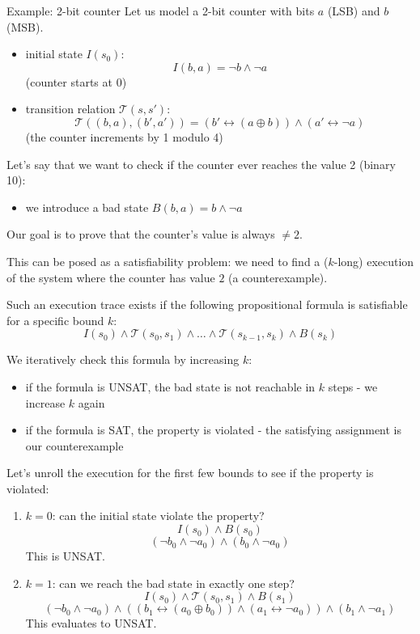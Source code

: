 \documentclass[a4paper, 11pt]{report}
\begin{document}
\begin{gframe}{Example: 2-bit counter}
Let us model a 2-bit counter with bits $a$ (LSB) and $b$ (MSB).

\begin{itemize}
    \item initial state $I(s_0)$:
        $$ I(b,a) = \neg b \wedge \neg a $$
        (counter starts at 0)
    
    \item transition relation $\mathcal{T}(s, s')$: 
    $$ \mathcal{T}((b,a), (b',a')) = (b' \leftrightarrow (a \oplus b)) \wedge (a' \leftrightarrow \neg a) $$
(the counter increments by 1 modulo 4)
    

\end{itemize}
Let's say that we want to check if the counter ever reaches the value 2 (binary 10):
    \begin{itemize}
        \item we introduce a bad state $ B(b,a) = b \wedge \neg a $
    \end{itemize}

Our goal is to prove that the counter's value is always $\neq 2$. 

This can be posed as a satisfiability problem: we need to find a ($k$-long) execution of the system where the counter has value $2$ (a counterexample).

Such an execution trace exists if the following propositional formula is satisfiable for a specific bound $k$:
$$ I(s_0) \wedge \mathcal{T}(s_0, s_1) \wedge \dots \wedge \mathcal{T}(s_{k-1}, s_k) \wedge B(s_k) $$

We iteratively check this formula by increasing $k$:
\begin{itemize}
    \item if the formula is UNSAT, the bad state is not reachable in $k$ steps - we increase $k$ again
    \item if the formula is SAT, the property is violated - the satisfying assignment is our counterexample
\end{itemize}

Let's unroll the execution for the first few bounds to see if the property is violated:
\begin{enumerate}
    \item \textbf{$k=0$}: can the initial state violate the property?
    $$ I(s_0) \wedge B(s_0) $$
    $$ (\neg b_0 \wedge \neg a_0) \wedge (b_0 \wedge \neg a_0) $$
    This is UNSAT.
    
    \item \textbf{$k=1$}: can we reach the bad state in exactly one step?
    $$ I(s_0) \wedge \mathcal{T}(s_0, s_1) \wedge B(s_1) $$
    $$ (\neg b_0 \wedge \neg a_0) \wedge ((b_1 \leftrightarrow (a_0 \oplus b_0)) \wedge (a_1 \leftrightarrow \neg a_0)) \wedge (b_1 \wedge \neg a_1) $$
    This evaluates to UNSAT.
    

\end{enumerate}
\end{gframe}
\end{document}
